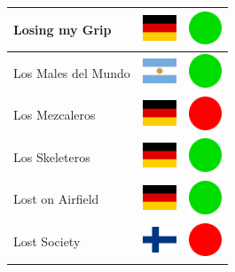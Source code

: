 \documentclass[12pt, a4paper, twoside]{report}
\begin{document}
\begin{center}
\begin{longtable}{|p{5cm}|p{2cm}|p{2cm}|}
 Losing my Grip                                             & \includegraphics[width=1cm]{../4x3/de} &   \includegraphics[width=1cm]{../likes/y} \\ \hline
 Los Males del Mundo                                        & \includegraphics[width=1cm]{../4x3/ar} &   \includegraphics[width=1cm]{../likes/y} \\ \hline
 Los Mezcaleros                                             & \includegraphics[width=1cm]{../4x3/de} &   \includegraphics[width=1cm]{../likes/n} \\ \hline
 Los Skeleteros                                             & \includegraphics[width=1cm]{../4x3/de} &   \includegraphics[width=1cm]{../likes/y} \\ \hline
 Lost on Airfield                                           & \includegraphics[width=1cm]{../4x3/de} &   \includegraphics[width=1cm]{../likes/y} \\ \hline
 Lost Society                                               & \includegraphics[width=1cm]{../4x3/fi} &   \includegraphics[width=1cm]{../likes/n} \\ \hline

\end{longtable}
\end{center}
\end{document}
